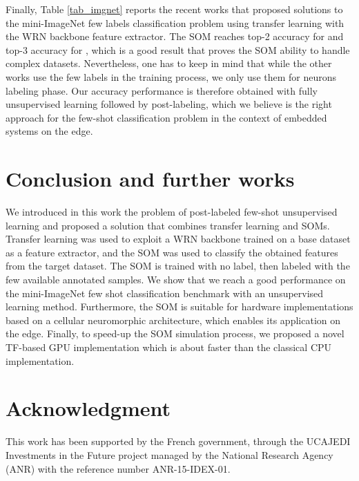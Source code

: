 \documentclass[runningheads]{llncs}
\begin{document}
Finally, Table \ref{tab_imgnet} reports the recent works that proposed solutions to the mini-ImageNet few labels classification problem using transfer learning with the WRN backbone feature extractor. The SOM reaches top-2 accuracy for  and top-3 accuracy for , which is a good result that proves the SOM ability to handle complex datasets. 
Nevertheless, one has to keep in mind that while the other works use the few labels in the training process, we only use them for neurons labeling phase. Our accuracy performance is therefore obtained with fully unsupervised learning followed by post-labeling, which we believe is the right approach for the few-shot classification problem in the context of embedded systems on the edge.



\section{Conclusion and further works}
\label{sec_conclusion}
We introduced in this work the problem of post-labeled few-shot unsupervised learning and proposed a solution that combines transfer learning and SOMs. Transfer learning was used to exploit a WRN backbone trained on a base dataset as a feature extractor, and the SOM was used to classify the obtained features from the target dataset. The SOM is trained with no label, then labeled with the few available annotated samples. We show that we reach a good performance on the mini-ImageNet few shot classification benchmark with an unsupervised learning method. Furthermore, the SOM is suitable for hardware implementations based on a cellular neuromorphic architecture, which enables its application on the edge. Finally, to speed-up the SOM simulation process, we proposed a novel TF-based GPU implementation which is about  faster than the classical CPU implementation.



\section*{Acknowledgment}
This work has been supported by the French government, through the UCAJEDI Investments in the Future project managed by the National Research Agency (ANR) with the reference number ANR-15-IDEX-01.
\end{document}
